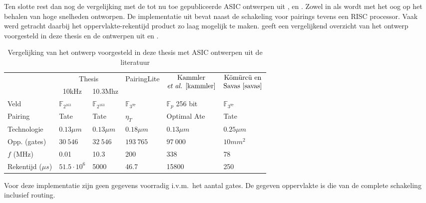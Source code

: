 Ten slotte rest dan nog de vergelijking met de tot nu toe gepubliceerde ASIC ontwerpen uit \cite{beuchat-asic}, \cite{kammler} en \cite{savas}. Zowel in \cite{beuchat-asic} als \cite{savas} wordt met het oog op het behalen van hoge snelheden ontworpen. De implementatie uit \cite{kammler} bevat naast de schakeling voor pairings tevens een RISC processor. Vaak werd getracht daarbij het oppervlakte-rekentijd product zo laag mogelijk te maken.  geeft een vergelijkend overzicht van het ontwerp voorgesteld in deze thesis en de ontwerpen uit \cite{beuchat-asic} en \cite{kammler}.

\begin{table}[h]
	\caption{Vergelijking van het ontwerp voorgesteld in deze thesis met ASIC ontwerpen uit de literatuur}
	\label{tabel-resultaten-asic}

	\centering
	\centering
	\begin{tabular}{llllll}
		\toprule
		&	\multicolumn{2}{c}{Thesis}	& \multirow{2}{*}{PairingLite \cite{beuchat-asic}}	& \multicolumn{1}{c}{\multirow{2}{*}{$\begin{array}{@{}c@{}}\text{Kammler}\\\text{\emph{et al.} \cite{kammler}}\end{array}$}}	&  \multicolumn{1}{c}{\multirow{2}{*}{$\begin{array}{@{}c@{}}\text{K\"om\"urc\"u en}\\\text{Savas \cite{savas}}\end{array}$}}\\
		\cmidrule(r){2-3}
		& \multicolumn{1}{c}{10kHz} & \multicolumn{1}{c}{10.3Mhz} & & &\\
 		\midrule
		Veld						& $\mathbb{F}_{2^{163}}$	& $\mathbb{F}_{2^{163}}$	& $\mathbb{F}_{3^{97}}$	& $\mathbb{F}_{p}$ 256 bit	& $\mathbb{F}_{3^{97}}$ \\
		Pairing					& Tate							& Tate							& $\eta_T$					& Optimal Ate 					& Tate\\
		Technologie				& $0.13 \mu m$					& $0.13 \mu m$					& $0.18 \mu m$				& $0.13 \mu m$					& $0.25 \mu m$\\
		Opp. (gates)			& $30\:546$						& $32\:546$						& $193\:765$				& $97\:000$						& \emph{$10mm^2$}\footnotemark[2]\\
		$f$ (MHz)				& 0.01							& 10.3							& 200							& 338								& 78\\
		Rekentijd ($\mu s$)	& $51.5 \cdot 10^6$			& 5000							& 46.7						& 15800							& 250\\
		\bottomrule		
	\end{tabular}
	
	\raggedright \footnotesize \footnotemark[2] Voor deze implementatie zijn geen gegevens voorradig i.v.m.\ het aantal gates. De gegeven oppervlakte is die van de complete schakeling inclusief routing.
\end{table}
